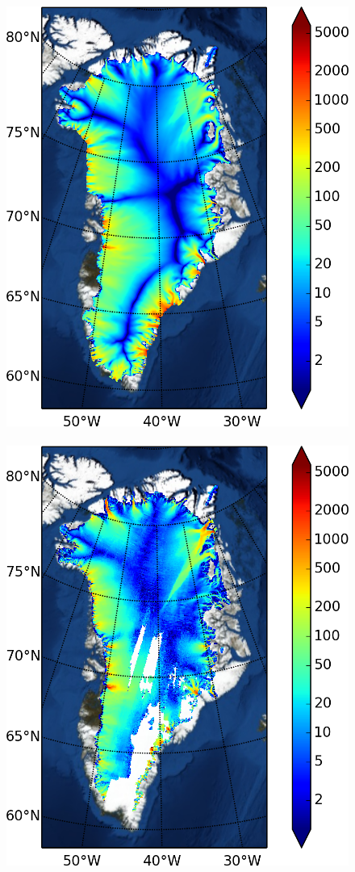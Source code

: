 \documentclass[gmd]{copernicus}   %
\begin{document}
\begin{figure}[ht]
\mbox{\includegraphics[height=\grnht,keepaspectratio=true]{g2km-init-velsurf-mag} \,
\includegraphics[height=\grnht,keepaspectratio=true]{Greenland-surfvelmag}}

\end{figure}
\end{document}

